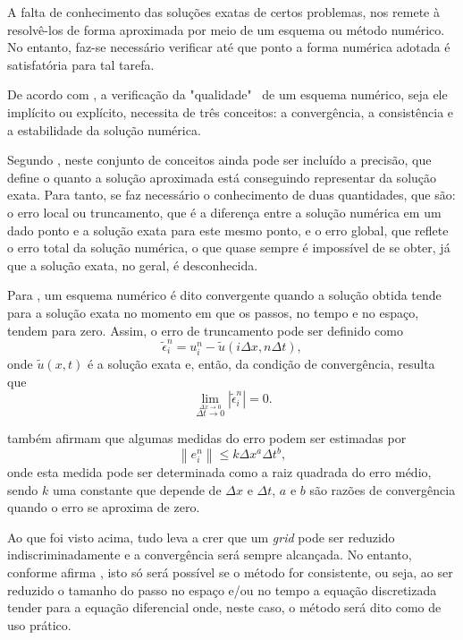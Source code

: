 A falta de conhecimento das soluções exatas de certos problemas, nos remete à resolvê-los de forma aproximada por meio de um esquema ou método numérico. No entanto, faz-se necessário verificar até que ponto a forma numérica adotada é satisfatória para tal tarefa.

De acordo com , a verificação da "qualidade" \ de um esquema numérico, seja ele implícito ou explícito, necessita de três conceitos: a convergência, a consistência e a estabilidade da solução numérica.

Segundo , neste conjunto de conceitos ainda pode ser incluído a precisão, que define o quanto a solução aproximada está conseguindo representar da solução exata. Para tanto, se faz necessário o conhecimento de duas quantidades, que são: o erro local ou truncamento, que é a diferença entre a solução numérica em um dado ponto e a solução exata para este mesmo ponto, e o erro global, que reflete o erro total da solução numérica, o que quase sempre é impossível de se obter, já que a solução exata, no geral, é desconhecida.

Para , um esquema numérico é dito convergente quando a solução obtida tende para a solução exata no momento em que os passos, no tempo e no espaço, tendem para zero. Assim, o erro de truncamento pode ser definido como
\begin{equation}
\tilde{ \epsilon}^{n}_{i} = u^{n}_{i} - \tilde{ u} \left( i \Delta x , n \Delta t \right),
\end{equation}
onde $ \tilde{ u}(x,t)$ é a solução exata e, então, da condição de convergência, resulta que
\begin{equation}
\lim_{ \stackrel{ \Delta x \rightarrow 0}{ \Delta t \rightarrow 0} } | \tilde{ \epsilon}^{n}_{i} | = 0.
\end{equation}

 também afirmam que algumas medidas do erro podem ser estimadas por
\begin{equation}
\left\| e^{n}_{i} \right\| \leq k \Delta x^{a} \Delta t^{b} ,
\end{equation}
onde esta medida pode ser determinada como a raiz quadrada do erro médio, sendo $k$ uma constante que depende de $ \Delta x$ e $ \Delta t$, $a$ e $b$ são razões de convergência quando o erro se aproxima de zero.

Ao que foi visto acima, tudo leva a crer que um \textit{grid} pode ser reduzido indiscriminadamente e a convergência será sempre alcançada. No entanto, conforme afirma , isto só será possível se o método for consistente, ou seja, ao ser reduzido o tamanho do passo no espaço e/ou no tempo a equação discretizada tender para a equação diferencial onde, neste caso, o método será dito como de uso prático.

